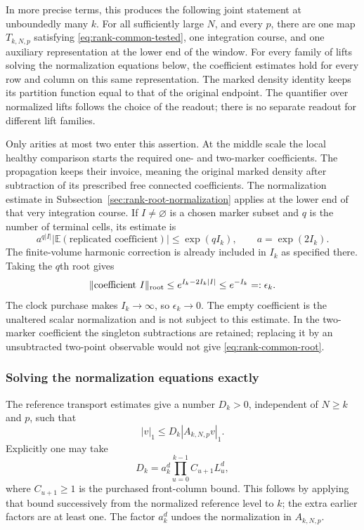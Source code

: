 In more precise terms, this produces the following joint statement at
unboundedly many $k$. For all sufficiently large $N$, and every $p$, there
are one map $T_{k,N,p}$ satisfying \eqref{eq:rank-common-tested}, one
integration course, and one auxiliary representation at the lower end
of the window. For every family of lifts solving the normalization
equations below, the coefficient estimates hold for every row and column
on this same representation. The marked density identity keeps its
partition function equal to that of the original endpoint. The
quantifier over normalized lifts follows the choice of the readout;
there is no separate readout for different lift families.

Only arities at most two enter this assertion. At the middle scale the
local healthy comparison starts the required one- and two-marker
coefficients. The propagation keeps their invoice, meaning the original
marked density after subtraction of its prescribed free connected
coefficients. The normalization estimate in
Subsection~\ref{sec:rank-root-normalization} applies at the lower end of
that very integration course. If $I\ne\varnothing$ is a chosen marker
subset and $q$ is the number of terminal cells, its estimate is
\[
 a^{q|I|}|\mathbb E(\text{replicated coefficient})|
       \le \exp(q I_k),\qquad a=\exp(2I_k).
\]
The finite-volume harmonic correction is already included in $I_k$ as
specified there. Taking the $q$th root gives
\begin{equation}\label{eq:rank-common-root}
       \|\text{coefficient }I\|_{\rm root}
       \le e^{I_k-2I_k|I|}\le e^{-I_k}=:\epsilon_k.
\end{equation}
The clock purchase makes $I_k\to\infty$, so $\epsilon_k\to0$.
The empty coefficient is the unaltered scalar normalization and is not
subject to this estimate. In the two-marker coefficient the singleton
subtractions are retained; replacing it by an unsubtracted two-point
observable would not give \eqref{eq:rank-common-root}.

\subsubsection{Solving the normalization equations exactly}

The reference transport estimates give a number $D_k>0$, independent of
$N\ge k$ and $p$, such that
\begin{equation}\label{eq:rank-reference-inverse}
                       |v|_1\le D_k|A_{k,N,p}v|_1.
\end{equation}
Explicitly one may take
\[
 D_k=a_k^d\prod_{u=0}^{k-1} C_{u+1}L_u^d,
\]
where $C_{u+1}\ge1$ is the purchased front-column bound. This follows
by applying that bound successively from the normalized reference level
to $k$; the extra earlier factors are at least one. The factor $a_k^d$
undoes the normalization in $A_{k,N,p}$.

